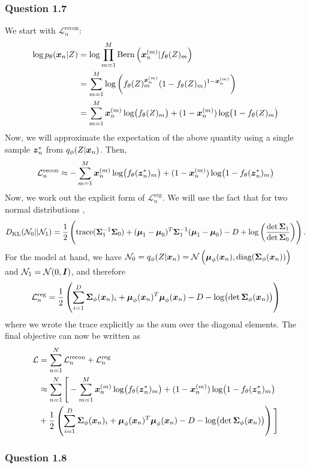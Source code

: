 \documentclass{article}
\begin{document}
\subsubsection*{Question 1.7}
We start with $\mathcal{L}^{\text{recon}}_n$:
$$
\begin{aligned}
\log p_\theta(\boldsymbol{x}_n | Z) &= \log \prod_{m=1}^{M}\text{Bern}\left(\boldsymbol{x}_n^{(m)} | f_\theta(Z)_m\right) \\ &= \sum_{m=1}^{M}\log\left(f_\theta(Z)_m^{\boldsymbol{x}_n^{(m)}}(1 - f_\theta(Z)_m)^{1 - \boldsymbol{x}_n^{(m)}}\right) \\ &= \sum_{m=1}^M \boldsymbol{x}_n^{(m)}\log(f_\theta(Z)_m) + (1 - \boldsymbol{x}_n^{(m)})\log(1 - f_\theta(Z)_m)
\end{aligned}
$$
Now, we will approximate the expectation of the above quantity using a single sample $\boldsymbol{z}^*_n$ from $q_\phi(Z | \boldsymbol{x}_n)$. Then, 
$$
\mathcal{L}^{\text{recon}}_n \approx - \sum_{m=1}^M \boldsymbol{x}_n^{(m)}\log(f_\theta(\boldsymbol{z}^*_n)_m) + (1 - \boldsymbol{x}_n^{(m)})\log(1 - f_\theta(\boldsymbol{z}^*_n)_m)
$$
Now, we work out the explicit form of $\mathcal{L}^{\text{reg}}_n$. We will use the fact that for two normal distributions \cite{doersch2016tutorial}, 
$$
D_{\text{KL}}(\mathcal{N}_0 || \mathcal{N}_1) = \frac{1}{2}\left(\text{trace}(\boldsymbol{\Sigma}_1^{-1}\boldsymbol{\Sigma}_0) + (\boldsymbol{\mu}_1 - \boldsymbol{\mu}_0)^T\boldsymbol{\Sigma}_1^{-1}(\boldsymbol{\mu}_1 - \boldsymbol{\mu}_0) - D + \log\left(\frac{\det\boldsymbol{\Sigma}_1}{\det\boldsymbol{\Sigma}_0}\right)\right).
$$ For the model at hand, we have $\mathcal{N}_0 = q_\phi(Z | \boldsymbol{x}_n) = \mathcal{N}\left(\boldsymbol{\mu}_\phi(\boldsymbol{x}_n), \text{diag}(\boldsymbol{\Sigma}_\phi(\boldsymbol{x}_n))\right)$ and $\mathcal{N}_1 = \mathcal{N}(0, \boldsymbol{I})$, and therefore
$$
\begin{aligned}
\mathcal{L}^{\text{reg}}_n = \frac{1}{2}\left(\sum_{i = 1}^D\boldsymbol{\Sigma}_\phi(\boldsymbol{x}_n)_i + \boldsymbol{\mu}_\phi(\boldsymbol{x}_n)^T \boldsymbol{\mu}_\phi(\boldsymbol{x}_n) - D - \log(\det \boldsymbol{\Sigma}_\phi(\boldsymbol{x}_n))\right)
\end{aligned}
$$ where we wrote the trace explicitly as the sum over the diagonal elements. The final objective can now be written as
$$
\begin{aligned}
\mathcal{L} &= \sum_{n=1}^{N} \mathcal{L}^{\text{recon}}_n + \mathcal{L}^{\text{reg}}_n \\ &\approx \sum_{n=1}^N \Bigg[ - \sum_{m=1}^M \boldsymbol{x}_n^{(m)}\log(f_\theta(\boldsymbol{z}^*_n)_m) + (1 - \boldsymbol{x}_n^{(m)})\log(1 - f_\theta(\boldsymbol{z}^*_n)_m) \\ &+ \frac{1}{2}\left(\sum_{i = 1}^D\boldsymbol{\Sigma}_\phi(\boldsymbol{x}_n)_i + \boldsymbol{\mu}_\phi(\boldsymbol{x}_n)^T \boldsymbol{\mu}_\phi(\boldsymbol{x}_n) - D - \log(\det \boldsymbol{\Sigma}_\phi(\boldsymbol{x}_n))\right)\Bigg]
\end{aligned}
$$
\subsubsection*{Question 1.8}


\end{document}
